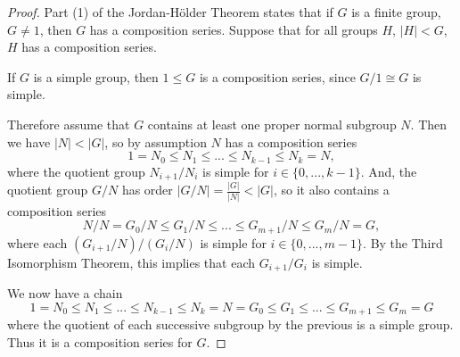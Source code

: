 \documentclass{article}
\begin{document}
\begin{proof}
    Part (1) of the Jordan-Hölder Theorem states that if $G$ is a finite group, $G \neq 1$, then $G$ has a composition series. Suppose that for all groups $H$, $|H| < G$, $H$ has a composition series.

    If $G$ is a simple group, then $1 \leq G$ is a composition series, since $G/1 \cong G$ is simple.
    
    Therefore assume that $G$ contains at least one proper normal subgroup $N$. Then we have $|N| < |G|$, so by assumption $N$ has a composition series
    \begin{equation*}
        1 = N_0 \leq N_1 \leq ... \leq N_{k - 1} \leq N_k = N,
    \end{equation*}
    where the quotient group $N_{i + 1}/N_i$ is simple for $i \in \{ 0, ..., k - 1 \}$. And, the quotient group $G/N$ has order $|G/N| = \frac{|G|}{|N|} < |G|$, so it also contains a composition series
    \begin{equation*}
        N/N = G_0/N \leq G_1/N \leq ... \leq G_{m + 1}/N \leq G_m/N = G,
    \end{equation*}
    where each $(G_{i + 1}/N)/(G_i/N)$ is simple for $i \in \{ 0, ..., m - 1 \}$. By the Third Isomorphism Theorem, this implies that each $G_{i + 1}/G_i$ is simple.

    We now have a chain
    \begin{equation*}
        1 = N_0 \leq N_1 \leq ... \leq N_{k - 1} \leq N_k = N = G_0 \leq G_1 \leq ... \leq G_{m + 1} \leq G_m = G
    \end{equation*}
    where the quotient of each successive subgroup by the previous is a simple group. Thus it is a composition series for $G$.
\end{proof}
\end{document}
